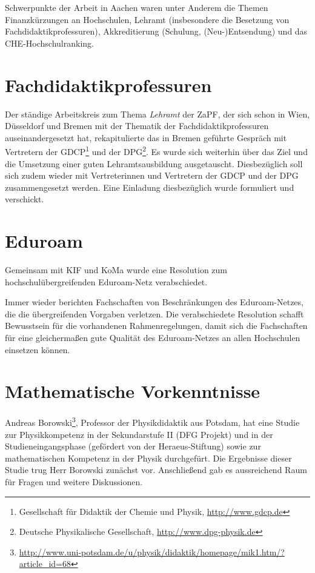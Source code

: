 \documentclass{scrartcl}
\renewcommand{\headrulewidth}{0pt}
\begin{document}
Schwerpunkte der Arbeit in Aachen waren unter Anderem die Themen Finanzkürzungen an Hochschulen, Lehramt (insbesondere die Besetzung von Fachdidaktikprofessuren), Akkreditierung (Schulung, (Neu-)Entsendung) und das CHE-Hochschulranking.

\pagebreak
\renewcommand{\headrulewidth}{0.1pt}
\rhead{\thepage}


\section*{Fachdidaktikprofessuren}

Der  ständige  Arbeitskreis zum Thema \emph{Lehramt} der ZaPF, der sich schon
in Wien, Düsseldorf und Bremen mit  der Thematik der Fachdidaktikprofessuren
auseinandergesetzt hat, rekapitulierte das in Bremen geführte Gespräch mit
Vertretern der GDCP\footnote{Gesellschaft für Didaktik der Chemie und Physik,
\href{http://www.gdcp.de}{\url{http://www.gdcp.de}}} und der DPG\footnote{Deutsche Physikalische Gesellschaft, \href{http://www.dpg-physik.de}{\url{http://www.dpg-physik.de}}}.
Es wurde sich weiterhin über  das Ziel und die Umsetzung einer guten
Lehramtsausbildung ausgetauscht.  Diesbezüglich soll sich zudem wieder mit
Vertreterinnen und Vertretern der GDCP und der DPG    zusammengesetzt werden.
Eine Einladung diesbezüglich wurde formuliert und verschickt.

\section*{Eduroam}

Gemeinsam mit KIF und KoMa wurde eine Resolution zum hochschulübergreifenden
Eduroam-Netz verabschiedet.

Immer wieder berichten Fachschaften von Beschränkungen des Eduroam-Netzes, die
die übergreifenden Vorgaben verletzen. Die verabschiedete Resolution schafft
Bewusstsein für die vorhandenen Rahmenregelungen, damit sich die Fachschaften
für eine gleichermaßen gute Qualität des Eduroam-Netzes an allen Hochschulen
einsetzen können.

\section*{Mathematische Vorkenntnisse}

Andreas Borowski\footnote{\href{http://www.uni-potsdam.de/u/physik/didaktik/homepage/mik1.htm/?article_id=68}{\url{http://www.uni-potsdam.de/u/physik/didaktik/homepage/mik1.htm/?article_id=68}}},
Professor der Physikdidaktik aus Potsdam, hat eine Studie zur Physikkompetenz
in der Sekundarstufe II (DFG Projekt) und in der Studieneingangsphase
(gefördert von der Heraeus-Stiftung) sowie zur mathematischen Kompetenz in
der Physik durchgefürt. Die Ergebnisse dieser Studie trug Herr Borowski
zunächst vor. Anschließend gab es aussreichend Raum für Fragen und weitere
Diskussionen.
\end{document}
